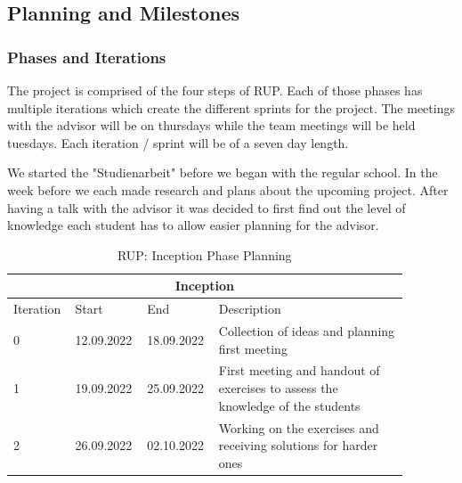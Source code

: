\subsection{Planning and Milestones}

\subsubsection*{Phases and Iterations}
The project is comprised of the four steps of RUP. Each of those phases has multiple iterations which create the different sprints for the project. The meetings with the advisor will be on thursdays while the team meetings will be held tuesdays. Each iteration / sprint will be of a seven day length.

\noindent We started the "Studienarbeit" before we began with the regular school. In the week before we each made research and plans about the upcoming project. After having a talk with the advisor it was decided to first find out the level of knowledge each student has to allow easier planning for the advisor.
\begin{table}[H]
    \centering
    \begin{tabular}{|p{0.12\linewidth}|p{0.15\linewidth}|p{0.15\linewidth}|p{0.46\linewidth}|}
        \hline
        \multicolumn{4}{||c||}{\textbf{Inception}} \\
        \hline \hline
        Iteration & Start & End & Description \\
        \hline \hline
        0 & 12.09.2022 & 18.09.2022 & Collection of ideas and planning first meeting\\
        \hline
        1 & 19.09.2022 & 25.09.2022 & First meeting and handout of exercises to assess the knowledge of the students \\
        \hline
        2 & 26.09.2022 & 02.10.2022 & Working on the exercises and receiving solutions for harder ones \\
        \hline
    \end{tabular}
    \caption{RUP: Inception Phase Planning}
    \label{inception_table}
\end{table}

